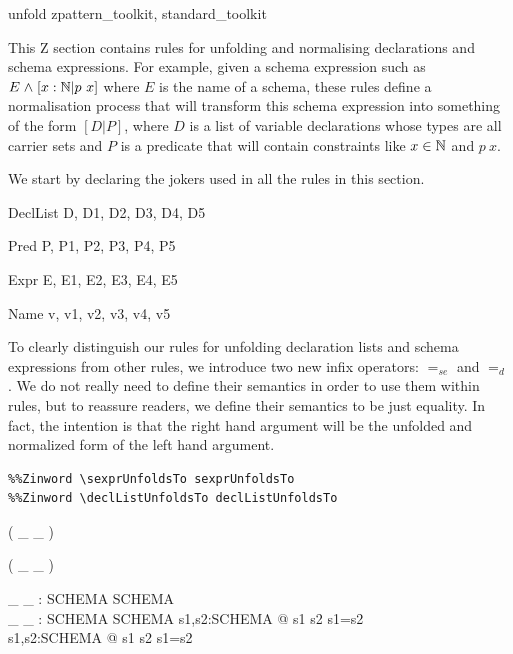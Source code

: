 \documentclass{entcs}
\newcommand{\sexprUnfoldsTo}{\mathrel{=_{se}}}
\newcommand{\declListUnfoldsTo}{\mathrel{=_d}}
\begin{document}
\begin{zsection}
  \SECTION unfold \parents zpattern\_toolkit, standard\_toolkit
\end{zsection}

This Z section contains rules for unfolding and normalising declarations
and schema expressions.  For example, given a schema expression such as 
$E \mathrel{\mathstrut{\wedge}} [x:{\mathbb N} | p~x]$ where $E$ is the name of a schema, these rules
define a normalisation process that will transform this schema expression
into something of the form $[D|P]$, where $D$ is a list of variable
declarations whose types are all carrier sets and $P$ is a predicate that
will contain constraints like $x \in {\mathbb N}$ and $p~x$.

We start by declaring the jokers used in all the rules in this section.

\begin{zedjoker}{DeclList} D, D1, D2, D3, D4, D5 \end{zedjoker}
\begin{zedjoker}{Pred} P, P1, P2, P3, P4, P5 \end{zedjoker}
\begin{zedjoker}{Expr} E, E1, E2, E3, E4, E5 \end{zedjoker}
\begin{zedjoker}{Name} v, v1, v2, v3, v4, v5 \end{zedjoker}

To clearly distinguish our rules for unfolding declaration lists and
schema expressions from other rules, we introduce two new infix
operators: $\sexprUnfoldsTo$ and $\declListUnfoldsTo$.  
We do not really need to define their semantics in order to use them within
rules, but to reassure readers, we define their semantics to be just
equality.  In fact, the intention is that the right hand argument
will be the unfolded and normalized form of the left hand argument.

\begin{verbatim}
%%Zinword \sexprUnfoldsTo sexprUnfoldsTo
%%Zinword \declListUnfoldsTo declListUnfoldsTo
\end{verbatim}

\begin{zed}
  \relation ( \_ \sexprUnfoldsTo \_ )
\end{zed}
\begin{zed}
  \relation ( \_ \declListUnfoldsTo \_ )
\end{zed}


\begin{gendef}[SCHEMA]
  \_ \sexprUnfoldsTo \_ : SCHEMA \rel SCHEMA \\
  \_ \declListUnfoldsTo \_ : SCHEMA \rel SCHEMA
\where
  \forall s1,s2:SCHEMA @ s1 \sexprUnfoldsTo s2 \iff s1=s2 \\
  \forall s1,s2:SCHEMA @ s1 \declListUnfoldsTo s2 \iff s1=s2 \\
\end{gendef}
\end{document}
